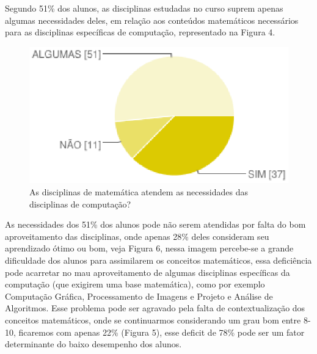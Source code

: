 \documentclass[12pt,a4paper]{article}
\begin{document}
Segundo 51\% dos alunos, as disciplinas estudadas no curso suprem apenas algumas necessidades deles, em relação aos conteúdos matemáticos necessários para as disciplinas específicas de computação, representado na Figura 4. 

\begin{figure}[htb]
	\center
	\includegraphics[scale=0.7]{imagens/4.eps} 
	\caption{As disciplinas de matemática atendem as necessidades das disciplinas de computação?}
	\label{img:grafDisciplinasNecessidades}
\end{figure}

As necessidades dos 51\% dos alunos pode não serem atendidas por falta do bom aproveitamento das disciplinas, onde apenas 28\% deles consideram seu aprendizado ótimo ou bom, veja Figura 6, nessa imagem percebe-se a grande dificuldade dos alunos para assimilarem os conceitos matemáticos, essa deficiência pode acarretar no mau aproveitamento de algumas disciplinas específicas da computação (que exigirem uma base matemática), como por exemplo Computação Gráfica, Processamento de Imagens e Projeto e Análise de Algoritmos. Esse problema pode ser agravado pela falta de contextualização dos conceitos matemáticos, onde se continuarmos considerando um grau bom entre 8-10, ficaremos com apenas 22\% (Figura 5), esse deficit de 78\% pode ser um fator determinante do baixo desempenho dos alunos. 
\end{document}
